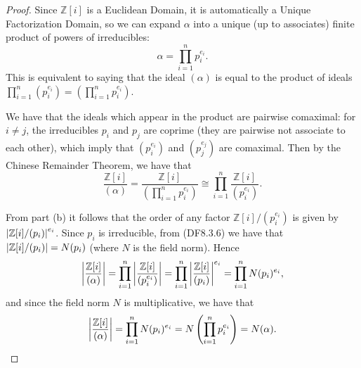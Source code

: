 \documentclass[11pt]{article}
\newcommand{\br}[1]{\left(#1\right)}
\begin{document}
\begin{enumerate}
\begin{enumerate}
\begin{proof}
            Since $\mathbb{Z}[i]$ is a Euclidean Domain, it is automatically a Unique Factorization Domain, so we can expand $\alpha$ into a unique (up to associates) finite product of powers of irreducibles: \[\alpha = \prod_{i=1}^n p_i^{e_i}.\] This is equivalent to saying that the ideal $(\alpha)$ is equal to the product of ideals $\prod_{i=1}^n (p_i^{e_i}) = \br{\prod_{i=1}^n p_i^{e_i}}$.

            We have that the ideals which appear in the product are pairwise comaximal: for $i\neq j$, the irreducibles $p_i$ and $p_j$ are coprime (they are pairwise not associate to each other), which imply that $(p_i^{e_i})$ and $(p_j^{e_j})$ are comaximal. Then by the Chinese Remainder Theorem, we have that \[\frac{\mathbb{Z}[i]}{(\alpha)} = \frac{\mathbb{Z}[i]}{\br{\prod_{i=1}^n p_i^{e_i}}} \cong \prod_{i=1}^n \frac{\mathbb{Z}[i]}{(p_i^{e_i})}.\]

            From part (b) it follows that the order of any factor $\mathbb{Z}[i]/(p_i^{e_i})$ is given by $\abs{\mathbb{Z}[i]/(p_i)}^{e_i}$. Since $p_i$ is irreducible, from (DF8.3.6) we have that $\abs{\mathbb{Z}[i]/(p_i)} = N(p_i)$ (where $N$ is the field norm). Hence \[\abs{\frac{\mathbb{Z}[i]}{(\alpha)}} = \prod_{i=1}^n \abs{\frac{\mathbb{Z}[i]}{(p_i^{e_i})}} = \prod_{i=1}^n \abs{\frac{\mathbb{Z}[i]}{(p_i)}}^{e_i} = \prod_{i=1}^n N(p_i)^{e_i},\] and since the field norm $N$ is multiplicative, we have that \[\abs{\frac{\mathbb{Z}[i]}{(\alpha)}} = \prod_{i=1}^n N(p_i)^{e_i} = N\br{\prod_{i=1}^n p_i^{e_i}} = N(\alpha).\]
        \end{proof}
    \end{enumerate}
\end{enumerate}
\end{document}

